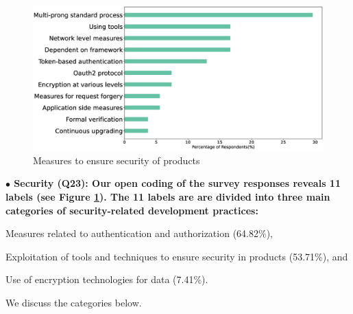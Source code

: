 \begin{figure}[h]
\centering
\includegraphics[scale=0.22]{Figures/Security.eps} 
\caption{Measures to ensure security of products}
\label{fig:Measures to ensure security}
\end{figure}
\nd\bf{$\bullet$ Security (Q23):} Our open coding of the survey responses reveals 11  
labels (see Figure \ref{fig:Measures to ensure security}). The 11 labels are are divided into three main categories of security-related development practices: 
\begin{inparaenum}
\item Measures related to authentication and authorization (64.82\%),
\item Exploitation of tools and techniques to ensure security in products (53.71\%), and 
\item Use of encryption technologies for data (7.41\%).
\end{inparaenum} We discuss the categories below.  


